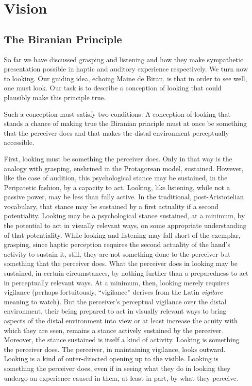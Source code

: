 \chapter{Vision} %
\label{cha:vision}

\section{The Biranian Principle} %
\label{sec:the_birnaian_principle}

So far we have discussed grasping and listening and how they make sympathetic presentation possible in haptic and auditory experience respectively. We turn now to looking. Our guiding idea, echoing Maine de Biran, is that in order to see well, one must look. Our task is to describe a conception of looking that could plausibly make this principle true. 

Such a conception must satisfy two conditions. A conception of looking that stands a chance of making true the Biranian principle must at once be something that the perceiver does and that makes the distal environment perceptually accessible.

First, looking must be something the perceiver does. Only in that way is the analogy with grasping, enshrined in the Protagorean model, sustained. However, like the case of audition, this psychological stance may be sustained, in the Peripatetic fashion, by a capacity to act. Looking, like listening, while not a passive power, may be less than fully active. In the traditional, post-Aristotelian vocabulary, that stance may be sustained by a first actuality if a second potentiality. Looking may be a psychological stance sustained, at a minimum, by the potential to act in visually relevant ways, on some appropriate understanding of that potentiality. While looking and listening may fall short of the exemplar, grasping, since haptic perception requires the second actuality of the hand's activity to sustain it, still, they are not something done to the perceiver but something that the perceiver does. What the perceiver does in looking may be sustained, in certain circumstances, by nothing further than a preparedness to act in perceptually relevant ways. At a minimum, then, looking merely requires vigilance (perhaps fortuitously, ``vigilance'' derives from the Latin \emph{vigilare} meaning to watch). But the perceiver's perceptual vigilance over the distal environment, their being prepared to act in visually relevant ways to bring aspects of the distal environment into view or at least increase the acuity with which they are seen, remains a stance actively sustained by the perceiver. Moreover, the stance sustained is itself a kind of activity. Looking is something the perceiver does. The perceiver, in maintaining vigilance, looks outward. Looking is a kind of outer-directed opening up to the visible. Looking is something the perceiver does, even if in seeing what they do in looking they undergo an experience caused in them, at least in part, by what they perceive.

